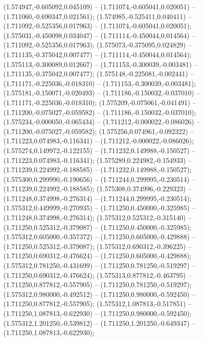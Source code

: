  (1.574947,-0.605092,0.045109) -- (1.711074,-0.605041,0.020051) -- (1.711060,-0.690347,0.021561);
 (1.574985,-0.525411,0.040411) -- (1.711092,-0.525356,0.017963) -- (1.711074,-0.605041,0.020051);
 (1.575031,-0.450098,0.034047) -- (1.711114,-0.450044,0.014564) -- (1.711092,-0.525356,0.017963);
 (1.575073,-0.375095,0.024829) -- (1.711135,-0.375042,0.007477) -- (1.711114,-0.450044,0.014564);
 (1.575113,-0.300089,0.012667) -- (1.711153,-0.300039,-0.003481) -- (1.711135,-0.375042,0.007477);
 (1.575148,-0.225081,-0.002441) -- (1.711171,-0.225036,-0.018310) -- (1.711153,-0.300039,-0.003481);
 (1.575181,-0.150071,-0.020493) -- (1.711186,-0.150032,-0.037010) -- (1.711171,-0.225036,-0.018310);
 (1.575209,-0.075061,-0.041491) -- (1.711200,-0.075027,-0.059582) -- (1.711186,-0.150032,-0.037010);
 (1.575234,-0.000050,-0.065434) -- (1.711212,-0.000022,-0.086026) -- (1.711200,-0.075027,-0.059582);
 (1.575256,0.074961,-0.092322) -- (1.711223,0.074983,-0.116341) -- (1.711212,-0.000022,-0.086026);
 (1.575274,0.149972,-0.122155) -- (1.711232,0.149988,-0.150527) -- (1.711223,0.074983,-0.116341);
 (1.575289,0.224982,-0.154933) -- (1.711239,0.224992,-0.188585) -- (1.711232,0.149988,-0.150527);
 (1.575300,0.299990,-0.190656) -- (1.711244,0.299995,-0.230514) -- (1.711239,0.224992,-0.188585);
 (1.575308,0.374996,-0.229323) -- (1.711248,0.374998,-0.276314) -- (1.711244,0.299995,-0.230514);
 (1.575312,0.449999,-0.270935) -- (1.711250,0.450000,-0.325985) -- (1.711248,0.374998,-0.276314);
 (1.575312,0.525312,-0.315140) -- (1.711250,0.525312,-0.379087) -- (1.711250,0.450000,-0.325985);
 (1.575312,0.605000,-0.357372) -- (1.711250,0.605000,-0.429888) -- (1.711250,0.525312,-0.379087);
 (1.575312,0.690312,-0.396225) -- (1.711250,0.690312,-0.476624) -- (1.711250,0.605000,-0.429888);
 (1.575312,0.781250,-0.431699) -- (1.711250,0.781250,-0.519297) -- (1.711250,0.690312,-0.476624);
 (1.575313,0.877812,-0.463795) -- (1.711250,0.877812,-0.557905) -- (1.711250,0.781250,-0.519297);
 (1.575312,0.980000,-0.492512) -- (1.711250,0.980000,-0.592450) -- (1.711250,0.877812,-0.557905);
 (1.575312,1.087813,-0.517851) -- (1.711250,1.087813,-0.622930) -- (1.711250,0.980000,-0.592450);
 (1.575312,1.201250,-0.539812) -- (1.711250,1.201250,-0.649347) -- (1.711250,1.087813,-0.622930);
